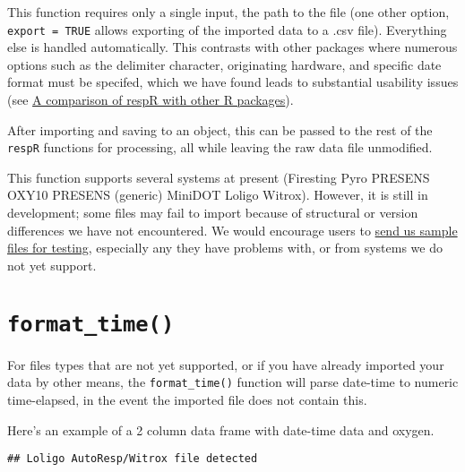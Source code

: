 \documentclass[]{book}
\newenvironment{Shaded}{\begin{snugshade}}{\end{snugshade}}
\newcommand{\KeywordTok}[1]{\textcolor[rgb]{0.13,0.29,0.53}{\textbf{#1}}}
\newcommand{\DecValTok}[1]{\textcolor[rgb]{0.00,0.00,0.81}{#1}}
\newcommand{\StringTok}[1]{\textcolor[rgb]{0.31,0.60,0.02}{#1}}
\newcommand{\OperatorTok}[1]{\textcolor[rgb]{0.81,0.36,0.00}{\textbf{#1}}}
\newcommand{\NormalTok}[1]{#1}
\begin{document}
This function requires only a single input, the path to the file (one
other option, \texttt{export\ =\ TRUE} allows exporting of the imported
data to a .csv file). Everything else is handled automatically. This
contrasts with other packages where numerous options such as the
delimiter character, originating hardware, and specific date format must
be specifed, which we have found leads to substantial usability issues
(see
\href{https://januarharianto.github.io/respR/articles/packages_comp.html}{A
comparison of respR with other R packages}).

After importing and saving to an object, this can be passed to the rest
of the \texttt{respR} functions for processing, all while leaving the
raw data file unmodified.

This function supports several systems at present (Firesting \textbar{}
Pyro \textbar{} PRESENS OXY10 \textbar{} PRESENS (generic) \textbar{}
MiniDOT \textbar{} Loligo Witrox). However, it is still in development;
some files may fail to import because of structural or version
differences we have not encountered. We would encourage users to
\href{https://github.com/januarharianto/respr/issues}{send us sample
files for testing}, especially any they have problems with, or from
systems we do not yet support.

\section{\texorpdfstring{\texttt{format\_time()}}{format\_time()}}\label{format_time}

For files types that are not yet supported, or if you have already
imported your data by other means, the \texttt{format\_time()} function
will parse date-time to numeric time-elapsed, in the event the imported
file does not contain this.

Here's an example of a 2 column data frame with date-time data and
oxygen.

\begin{Shaded}
\end{Shaded}

\begin{verbatim}
## Loligo AutoResp/Witrox file detected
\end{verbatim}
\end{document}
